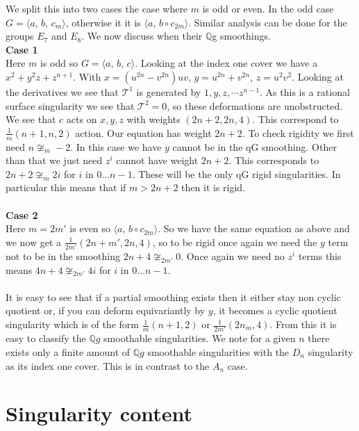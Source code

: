 \documentclass[11pt]{report}
\theoremstyle{definition}
\theoremstyle{definition}
\theoremstyle{definition}
\theoremstyle{definition}
\theoremstyle{definition}
\theoremstyle{definition}
\theoremstyle{definition}
\theoremstyle{definition}
\begin{document}
We split this into two cases the case where $m$ is odd or even. In the odd case $G = \langle a, \, b, \, c_m \rangle$, otherwise it it is $\langle a, \, b \circ c_{2m} \rangle$.
Similar analysis can be done for the groups $E_7$ and $E_8$. We now discuss when their $\mathbb{Q}$g smoothings.
\\
\textbf{Case 1}
\\
Here $m$ is odd so  $G = \langle a, \, b , \, c \rangle$.  Looking at the index one cover we have a $x^2 + y^2z + z^{n+1}$. With $x = (u^{2n} - v^{2n})uv$, $y = u^{2n} + v^{2n}$, $z = u^2v^2$. Looking at the derivatives we see that $\mathcal{T}^1$ is generated by $1,y, z, \cdots z^{n-1}$. As this is a rational surface singularity we see that $\mathcal{T}^2 = 0$, so these deformations are unobstructed. We see that $c$ acts on $x,y,z$ with weights $(2n+2, 2n, 4)$. This correspond to $\frac{1}{m}(n+1, n, 2)$ action. Our equation has weight $2n+2$. To check rigidity we first need $n \not\cong_m -2$. In this case we have $y$ cannot be in the qG smoothing. Other than that we just need $z^i$ cannot have weight $2n+2$. This corresponds to $2n+2 \not\cong_m 2i$ for $i$ in $0 \dots n-1$. These will be the only qG rigid singularities. In particular this means that if $m > 2n+2$ then it is rigid.
\\
\\
\textbf{Case 2}
\\
Here $m = 2m'$ is even so $\langle a, \, b \circ c_{2m} \rangle$. So we have the same equation as above and we now get a 
$\frac{1}{2m'}(2n+m', 2n, 4)$, so to be rigid once again we need the $y$ term not to be in the smoothing $2n+4
 \not\cong_{2m'} 0$. Once again we need no $z^i$ terms this means  $4n+4 \not\cong_{2m'} 4i$  for $i$ in $0 \dots n-1$. 
 \\
 \\
 It is easy to see that if a partial smoothing exists then it either stay non cyclic quotient or, if you can deform equivariantly by $y$, it becomes a cyclic quotient singularity which is of the form $\frac{1}{m}(n+1, 2)$ or $\frac{1}{2m'}(2n_m, 4)$. From this it is easy to classify the $\mathbb{Q}g$ smoothable singularities. We note for a given $n$ there exists only a finite amount of $\mathbb{Q}g$ smoothable singularities with the $D_n$ singularity as its index one cover. This is in contrast to the $A_n$ case.
 
 \section{Singularity content}
 
\end{document}
